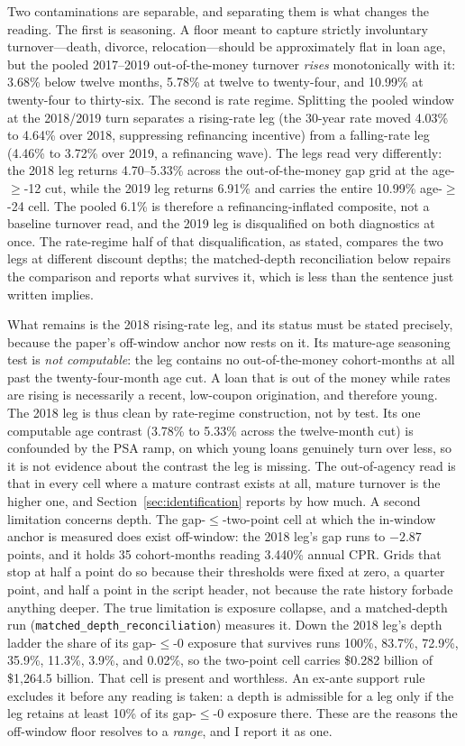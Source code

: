 \documentclass[12pt]{article}
\begin{document}
Two contaminations are separable, and separating them is what changes the reading. The first is seasoning. A floor meant to capture strictly involuntary turnover---death, divorce, relocation---should be approximately flat in loan age, but the pooled 2017--2019 out-of-the-money turnover \emph{rises} monotonically with it: 3.68\% below twelve months, 5.78\% at twelve to twenty-four, and 10.99\% at twenty-four to thirty-six. The second is rate regime. Splitting the pooled window at the 2018/2019 turn separates a rising-rate leg (the 30-year rate moved 4.03\% to 4.64\% over 2018, suppressing refinancing incentive) from a falling-rate leg (4.46\% to 3.72\% over 2019, a refinancing wave). The legs read very differently: the 2018 leg returns 4.70--5.33\% across the out-of-the-money gap grid at the age-$\geq$-12 cut, while the 2019 leg returns 6.91\% and carries the entire 10.99\% age-$\geq$-24 cell. The pooled 6.1\% is therefore a refinancing-inflated composite, not a baseline turnover read, and the 2019 leg is disqualified on both diagnostics at once. The rate-regime half of that disqualification, as stated, compares the two legs at different discount depths; the matched-depth reconciliation below repairs the comparison and reports what survives it, which is less than the sentence just written implies.

What remains is the 2018 rising-rate leg, and its status must be stated precisely, because the paper's off-window anchor now rests on it. Its mature-age seasoning test is \emph{not computable}: the leg contains no out-of-the-money cohort-months at all past the twenty-four-month age cut. A loan that is out of the money while rates are rising is necessarily a recent, low-coupon origination, and therefore young. The 2018 leg is thus clean by rate-regime construction, not by test. Its one computable age contrast (3.78\% to 5.33\% across the twelve-month cut) is confounded by the PSA ramp, on which young loans genuinely turn over less, so it is not evidence about the contrast the leg is missing. The out-of-agency read is that in every cell where a mature contrast exists at all, mature turnover is the higher one, and Section~\ref{sec:identification} reports by how much. A second limitation concerns depth. The gap-$\leq$-two-point cell at which the in-window anchor is measured does exist off-window: the 2018 leg's gap runs to $-2.87$ points, and it holds 35 cohort-months reading 3.440\% annual CPR. Grids that stop at half a point do so because their thresholds were fixed at zero, a quarter point, and half a point in the script header, not because the rate history forbade anything deeper. The true limitation is exposure collapse, and a matched-depth run (\texttt{matched\_depth\_reconciliation}) measures it. Down the 2018 leg's depth ladder the share of its gap-$\leq$-0 exposure that survives runs 100\%, 83.7\%, 72.9\%, 35.9\%, 11.3\%, 3.9\%, and 0.02\%, so the two-point cell carries \$0.282 billion of \$1{,}264.5 billion. That cell is present and worthless. An ex-ante support rule excludes it before any reading is taken: a depth is admissible for a leg only if the leg retains at least 10\% of its gap-$\leq$-0 exposure there. These are the reasons the off-window floor resolves to a \emph{range}, and I report it as one.
\end{document}
